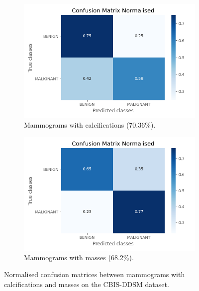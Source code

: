 \begin{figure}[h]
\centering
\begin{subfigure}{.5\textwidth}
  \centering
  \includegraphics[width=\textwidth]{figures/evaluation/common/CM-norm_basic-model_CBIS-DDSM-dataset-Calc.png}
  \caption{Mammograms with calcifications (70.36\%).}
  \label{fig:evaluation-cbisddsm-common-calc}
\end{subfigure}%
\begin{subfigure}{.5\textwidth}
  \centering
  \includegraphics[width=\textwidth]{figures/evaluation/common/CM-norm_basic-model_CBIS-DDSM-dataset-Mass.png}
  \caption{Mammograms with masses (68.2\%).}
  \label{fig:evaluation-cbisddsm-common-mass}
\end{subfigure}
\caption{\label{fig:evaluation-cbisddsm-common-mass-vs-calc}Normalised confusion matrices between mammograms with calcifications and masses on the CBIS-DDSM dataset.}
\end{figure}

